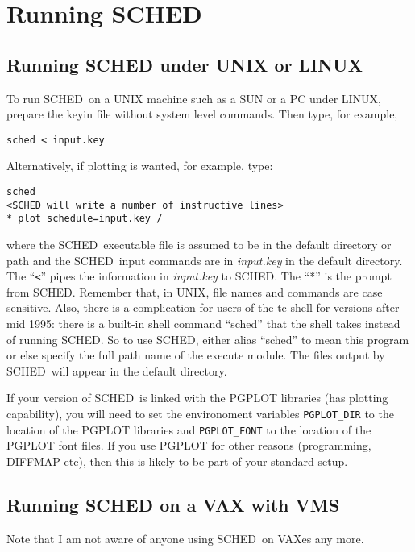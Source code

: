 \documentclass{report}
\newcommand{\sched}{{\sc SCHED}}
\newcommand{\schedb}{{\sc SCHED~}}
\begin{document}
\section{\label{SEC:RUNSCHED}Running SCHED}

\subsection{\label{SSEC:RUNUNIX}Running SCHED under UNIX or LINUX}

To run \schedb on a UNIX machine such as a SUN or a PC under LINUX,
prepare the keyin file without system level commands.  Then type, for
example,
\begin{verbatim}
sched < input.key
\end{verbatim}
Alternatively, if plotting is wanted, for example, type:
\begin{verbatim}
sched
<SCHED will write a number of instructive lines>
* plot schedule=input.key /
\end{verbatim}
where the \schedb executable file is assumed to be in the default
directory or path and the \schedb input commands are in {\sl input.key}
in the default directory. The ``{\tt <}'' pipes the information in
{\sl input.key} to \sched.  The ``*'' is the prompt from \sched.
Remember that, in UNIX, file names and
commands are case sensitive.  Also, there is a complication for users
of the tc shell for versions after mid 1995: there is a built-in shell
command ``sched'' that the shell takes instead of running {\sc
SCHED}. So to use \sched, either alias ``sched'' to mean this
program or else specify the full path name of the execute module. The
files output by \schedb will appear in the default directory.

If your version of \schedb is linked with the {\sc PGPLOT} libraries
(has plotting capability), you will need
to set the environoment variables {\tt PGPLOT\_DIR} to the location of
the {\sc PGPLOT} libraries and {\tt PGPLOT\_FONT} to the location of
the {\sc PGPLOT} font files.  If you use {\sc PGPLOT} for other
reasons (programming, DIFFMAP etc), then this is likely to be part
of your standard setup.

\subsection{\label{SSEC:RUNVAX}Running SCHED on a VAX with VMS}

Note that I am not aware of anyone using \schedb on VAXes any more.
\end{document}
